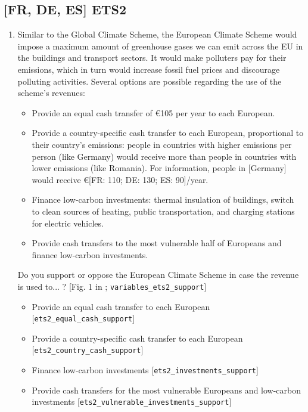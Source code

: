 \subsection*{[FR, DE, ES] ETS2}
\begin{enumerate}[resume] 
    \item  Similar to the Global Climate Scheme, the European Climate Scheme would impose a maximum amount of greenhouse gases we can emit across the EU in the buildings and transport sectors. It would make polluters pay for their emissions, which in turn would increase fossil fuel prices and discourage polluting activities. Several options are possible regarding the use of the scheme's revenues:
    \begin{itemize}
        \item Provide an equal cash transfer of \euro{}105 per year to each European.
        \item Provide a country-specific cash transfer to each European, proportional to their country's emissions: people in countries with higher emissions per person (like Germany) would receive more than people in countries with lower emissions (like Romania). For information, people in [Germany] would receive \euro{}[FR: 110; DE: 130; ES: 90]/year.
        \item Finance low-carbon investments: thermal insulation of buildings, switch to clean sources of heating, public transportation, and charging stations for electric vehicles.
        \item Provide cash transfers to the most vulnerable half of Europeans and finance low-carbon investments. 
    \end{itemize}     	 	 	 
    Do you support or oppose the European Climate Scheme in case the revenue is used to... ? [Fig. 1 in ; \verb|variables_ets2_support|]
    \begin{itemize}
        \item  Provide an equal cash transfer to each European [\verb|ets2_equal_cash_support|]
        \item  Provide a country-specific cash transfer to each European [\verb|ets2_country_cash_support|]
        \item  Finance low-carbon investments [\verb|ets2_investments_support|]
        \item  Provide cash transfers for the most vulnerable Europeans and low-carbon investments [\verb|ets2_vulnerable_investments_support|]
    \end{itemize}

\end{enumerate}
